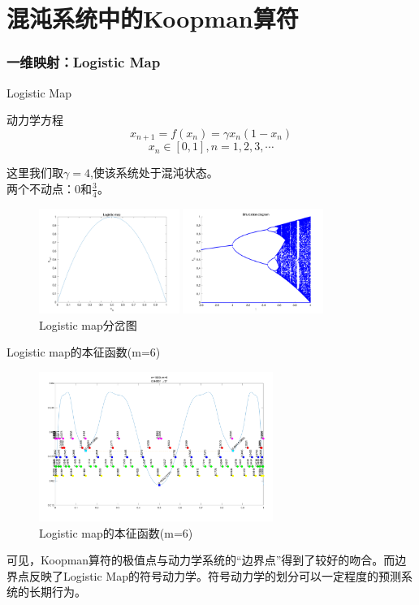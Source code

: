 \documentclass{beamer}
\begin{document}
\section{混沌系统中的Koopman算符}
		\subsubsection{一维映射：Logistic Map}
		\begin{frame}{Logistic Map}
		\begin{block}{动力学方程}
			$$x_{n+1}=f(x_n)=\gamma x_n(1-x_n)$$
			$$x_n\in [0,1], n=1,2,3,\cdots$$
		\end{block}
		这里我们取$\gamma=4$,使该系统处于混沌状态。\\
		两个不动点：0和$\frac{3}{4}$。
		\begin{figure}
			\begin{minipage}{0.4\linewidth}
				\centering
				\includegraphics[width=1.8in]{figure/logistic_phase}
				\caption{Logistic map相图}
			\end{minipage}
			\begin{minipage}{0.4\linewidth}
				\centering
				\includegraphics[width=1.8in]{figure/logistic_bifurcation}
				\caption{Logistic map分岔图}
			\end{minipage}
		\end{figure}
		\end{frame}
\begin{frame}{Logistic map的本征函数(m=6)}
	\begin{figure}
		\centering
		\includegraphics[width=3in]{figure/logistic_eigen_m6}
		\caption{Logistic map的本征函数(m=6)}
	\end{figure}
	可见，Koopman算符的极值点与动力学系统的“边界点”得到了较好的吻合。而边界点反映了Logistic Map的符号动力学。符号动力学的划分可以一定程度的预测系统的长期行为。
\end{frame}
\end{document}
